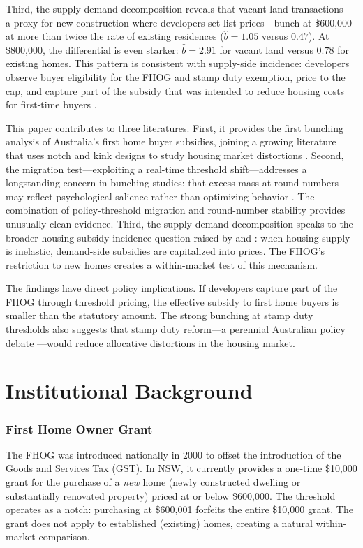 \documentclass[12pt]{article}
\begin{document}
Third, the supply-demand decomposition reveals that vacant land transactions---a proxy for new construction where developers set list prices---bunch at \$600,000 at more than twice the rate of existing residences ($\hat{b} = 1.05$ versus $0.47$). At \$800,000, the differential is even starker: $\hat{b} = 2.91$ for vacant land versus $0.78$ for existing homes. This pattern is consistent with supply-side incidence: developers observe buyer eligibility for the FHOG and stamp duty exemption, price to the cap, and capture part of the subsidy that was intended to reduce housing costs for first-time buyers \citep{susin2002rent, grislain2019housing}.

This paper contributes to three literatures. First, it provides the first bunching analysis of Australia's first home buyer subsidies, joining a growing literature that uses notch and kink designs to study housing market distortions \citep{best2018housing, kopczuk2016housing}. Second, the migration test---exploiting a real-time threshold shift---addresses a longstanding concern in bunching studies: that excess mass at round numbers may reflect psychological salience rather than optimizing behavior \citep{kleven2016bunching}. The combination of policy-threshold migration and round-number stability provides unusually clean evidence. Third, the supply-demand decomposition speaks to the broader housing subsidy incidence question raised by \citet{susin2002rent} and \citet{glaeser2008housing}: when housing supply is inelastic, demand-side subsidies are capitalized into prices. The FHOG's restriction to new homes creates a within-market test of this mechanism.

The findings have direct policy implications. If developers capture part of the FHOG through threshold pricing, the effective subsidy to first home buyers is smaller than the statutory amount. The strong bunching at stamp duty thresholds also suggests that stamp duty reform---a perennial Australian policy debate \citep{daley2018money, dachis2012role}---would reduce allocative distortions in the housing market.


\section{Institutional Background}

\subsubsection*{First Home Owner Grant} The FHOG was introduced nationally in 2000 to offset the introduction of the Goods and Services Tax (GST). In NSW, it currently provides a one-time \$10,000 grant for the purchase of a \textit{new} home (newly constructed dwelling or substantially renovated property) priced at or below \$600,000. The threshold operates as a notch: purchasing at \$600,001 forfeits the entire \$10,000 grant. The grant does not apply to established (existing) homes, creating a natural within-market comparison.
\end{document}
